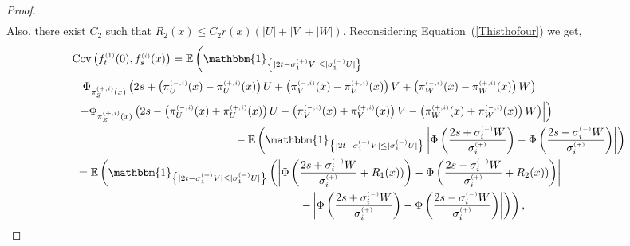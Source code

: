 \documentclass[12pt]{article}
\theoremstyle{Theorem}
\begin{document}
\begin{proof}
{\begin{align*}
\end{align*}}
Also, there exist $C_2$ such that $R_{2}(x) \leq C_{2}r(x)\left(|U| + |V| + |W|\right)$. 
Reconsidering Equation~(\ref{Thisthofour}) we get,
{\small
\begin{align*}
 \text{Cov}\left(f_{t}^{\scriptscriptstyle(1)}(0), f_{s}^{\scriptscriptstyle(i)}(x) \right) & =  \mathbb{E}\left(\mathbbm{1}_{\left\{ |2t - \sigma^{\scriptscriptstyle (+)}_{1}V| \leq |\sigma^{\scriptscriptstyle (-)}_{1}U|\right\}}\right. \\
&\hspace{-3cm} \left. \left|\Phi_{ \pi^{\scriptscriptstyle(+, i)}_{Z}(x)}\left( 2s + \left( \pi^{\scriptscriptstyle(-, i)}_{U}(x)- \pi^{\scriptscriptstyle(+, i)}_{U}(x)\right) U + \left(\pi^{\scriptscriptstyle(-, i)}_{V}(x)- \pi^{\scriptscriptstyle(+, i)}_{V}(x)\right)V + \left(\pi^{\scriptscriptstyle(-, i)}_{W}(x) - \pi^{\scriptscriptstyle(+, i)}_{W}(x)\right) W \right) \right. \right.  \nonumber \\
& \hspace{-3cm}\left. \left.  - \Phi_{ \pi^{\scriptscriptstyle(+, i)}_{Z}(x)}\left( 2s - \left( \pi^{\scriptscriptstyle(-, i)}_{U}(x)+ \pi^{\scriptscriptstyle(+, i)}_{U}(x)\right) U - \left(\pi^{\scriptscriptstyle(-, i)}_{V}(x)+ \pi^{\scriptscriptstyle(+, i)}_{V}(x)\right)V   - \left( \pi^{\scriptscriptstyle(+, i)}_{W}(x) +  \pi^{\scriptscriptstyle(-, i)}_{W}(x) \right)W \right)  \right| \right) \\
& \hspace{2cm} - \mathbb{E}\left(\mathbbm{1}_{\left\{ |2t - \sigma^{\scriptscriptstyle (+)}_{1}V| \leq |\sigma^{\scriptscriptstyle (-)}_{1}U|\right\}}\left|\Phi\left(\frac{2s + \sigma^{\scriptscriptstyle (-)}_{i}W}{\sigma^{\scriptscriptstyle (+)}_{i}} \right) - \Phi\left(\frac{2s -\sigma^{\scriptscriptstyle (-)}_{i}W }{\sigma^{\scriptscriptstyle (+)}_{i}} \right)\right|\right)\\
& \hspace{-3cm} = \mathbb{E}\left(\mathbbm{1}_{\left\{ |2t - \sigma^{\scriptscriptstyle (+)}_{1}V| \leq |\sigma^{\scriptscriptstyle (-)}_{1}U|\right\}} \left(\left|\Phi\left(\frac{2s + \sigma^{\scriptscriptstyle (-)}_{i}W}{\sigma^{\scriptscriptstyle (+)}_{i}} + R_{1}(x)) \right) - \Phi\left(\frac{2s -\sigma^{\scriptscriptstyle (-)}_{i}W }{\sigma^{\scriptscriptstyle (+)}_{i}} + R_{2}(x))\right)\right| \right. \right. \\
& \hspace{4cm} \left.\left. -  \left|\Phi\left(\frac{2s + \sigma^{\scriptscriptstyle (-)}_{i}W}{\sigma^{\scriptscriptstyle (+)}_{i}} \right) - \Phi\left(\frac{2s -\sigma^{\scriptscriptstyle (-)}_{i}W }{\sigma^{\scriptscriptstyle (+)}_{i}} \right)\right| \right)\right),

\end{align*}}
\end{proof}
\end{document}
